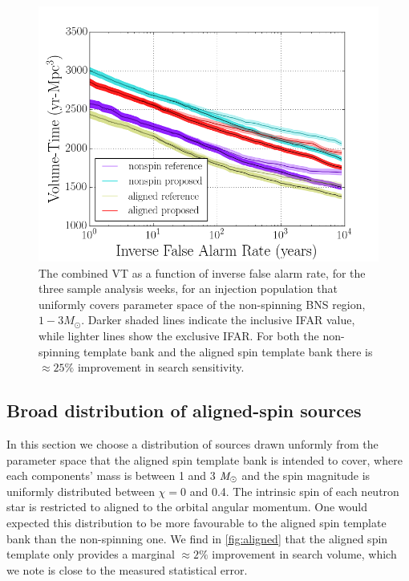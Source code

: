 \begin{figure}
\centering
\includegraphics[width=1.0\textwidth]{papers/bns_o1_dev/figures/ns_combined.png}
\caption{\label{fig:nonspin} 
The combined VT as a function of inverse false alarm rate, for the
three sample analysis weeks, for an injection population that uniformly covers parameter space of the non-spinning BNS region, $1- 3M_\odot$. Darker shaded lines indicate the inclusive IFAR value, while lighter lines show the exclusive IFAR. For both the non-spinning template bank and the aligned spin template bank there is $\approx 25 \%$ improvement in search sensitivity.
}
\end{figure}

\subsection{Broad distribution of aligned-spin sources}
\label{sec:baligned}

In this section we choose a distribution of sources drawn unformly from the parameter space that the aligned spin template bank is intended to cover, where each components' mass is between 1 and 3 $\mathit{M}_\odot$ and the spin magnitude is uniformly distributed between $\chi=$0 and 0.4. The intrinsic spin of each neutron star is restricted to aligned to the orbital angular momentum. One would expected this distribution to be more favourable to the aligned spin template bank than the non-spinning one. We find in \ref{fig:aligned} that the aligned spin template only provides a marginal $\approx 2\%$ improvement in search volume, which we note is close to the measured statistical error. 

